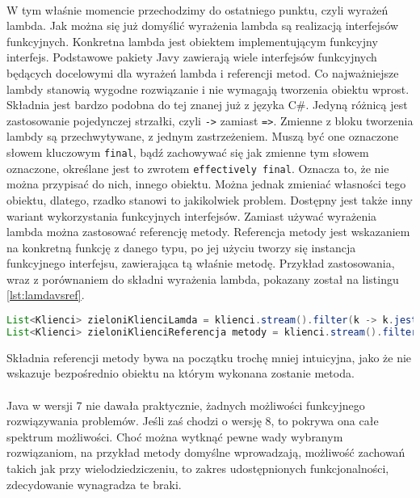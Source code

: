 \documentclass[a4paper,10pt]{report}
\begin{document}
\paragraph{}
W tym właśnie momencie przechodzimy do ostatniego punktu, czyli wyrażeń lambda. Jak można się już domyślić wyrażenia lambda są realizacją interfejsów funkcyjnych. Konkretna lambda jest obiektem implementującym funkcyjny interfejs. Podstawowe pakiety Javy zawierają wiele interfejsów funkcyjnych będących docelowymi dla wyrażeń lambda i referencji metod. Co najważniejsze lambdy stanowią wygodne rozwiązanie i nie wymagają tworzenia obiektu wprost. Składnia jest bardzo podobna do tej znanej już z języka C\#. Jedyną różnicą jest zastosowanie pojedynczej strzałki, czyli \verb|->| zamiast \verb|=>|. Zmienne z bloku tworzenia lambdy są przechwytywane, z jednym zastrzeżeniem. Muszą być one oznaczone słowem kluczowym \verb|final|, bądź zachowywać się jak zmienne tym słowem oznaczone, określane jest to zwrotem \verb|effectively final|. Oznacza to, że nie można przypisać do nich, innego obiektu. Można jednak zmieniać własności tego obiektu, dlatego, rzadko stanowi to jakikolwiek problem. Dostępny jest także inny wariant wykorzystania funkcyjnych interfejsów. Zamiast używać wyrażenia lambda można zastosować referencję metody. Referencja metody jest wskazaniem na konkretną funkcję z danego typu, po jej użyciu tworzy się instancja funkcyjnego interfejsu, zawierająca tą właśnie metodę. Przykład zastosowania, wraz z porównaniem do składni wyrażenia lambda, pokazany został na listingu \ref{lst:lamdavsref}. 
\begin{lstlisting}[caption={Wyrażenie lamda, a referencja metody},label={lst:lamdavsref},language=Java]
List<Klienci> zieloniKlienciLamda = klienci.stream().filter(k -> k.jestZielony()).collect(toList());
List<Klienci> zieloniKlienciReferencja metody = klienci.stream().filter(Klient::jestZielony).collect(toList());
\end{lstlisting}
Składnia referencji metody bywa na początku trochę mniej intuicyjna, jako że nie wskazuje bezpośrednio obiektu na którym wykonana zostanie metoda.
\paragraph{}
Java w wersji 7 nie dawała praktycznie, żadnych możliwości funkcyjnego rozwiązywania problemów. Jeśli zaś chodzi o wersję 8, to pokrywa ona całe spektrum możliwości. Choć można wytknąć pewne wady wybranym rozwiązaniom, na przykład metody domyślne wprowadzają, możliwość zachowań takich jak przy wielodziedziczeniu, to zakres udostępnionych funkcjonalności, zdecydowanie wynagradza te braki.
\end{document}

